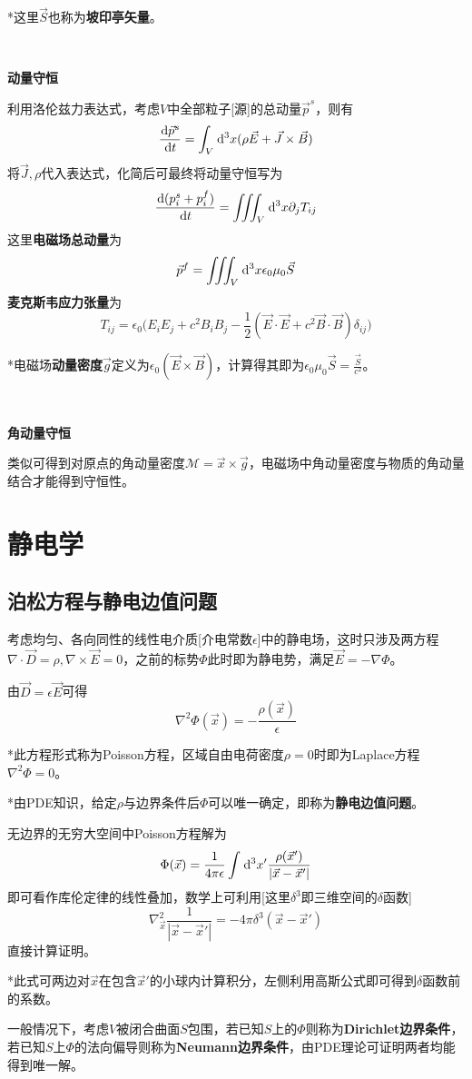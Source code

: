 \documentclass[a4paper,UTF8,fontset=windows]{ctexart}
\newcommand*{\dr}{\hspace{0.07em}\mathrm{d}}
\newcommand*{\vb}{\vec{B}}
\newcommand*{\vd}{\vec{D}}
\newcommand*{\ve}{\vec{E}}
\newcommand*{\vj}{\vec{J}}
\newcommand*{\vs}{\vec{S}}
\newcommand*{\vg}{\vec{g}}
\newcommand*{\vps}{\vec{p}}
\newcommand*{\vx}{\vec{x}}
\newcommand*{\dt}[2][t]{\frac{\dr #2}{\dr #1}}
\begin{document}
*这里$\vs$也称为\textbf{坡印亭矢量}。

\

\textbf{动量守恒}

利用洛伦兹力表达式，考虑$V$中全部粒子[源]的总动量$\vps^s$，则有
$$\dt{\vps^s}=\int_V\dr^3x(\rho\ve+\vj\times\vb)$$
将$\vj,\rho$代入表达式，化简后可最终将动量守恒写为
$$\dt{(p^s_i+p^f_i)}=\iiint_V\dr^3x\partial_jT_{ij}$$
这里\textbf{电磁场总动量}为
$$\vps^f=\iiint_V\dr^3x\epsilon_0\mu_0\vs$$
\textbf{麦克斯韦应力张量}为
$$T_{ij}=\epsilon_0\bigg(E_iE_j+c^2B_iB_j-\frac{1}{2}(\ve\cdot\ve+c^2\vb\cdot\vb)\delta_{ij}\bigg)$$

*电磁场\textbf{动量密度}$\vec{g}$定义为$\epsilon_0(\ve\times\vb)$，计算得其即为$\epsilon_0\mu_0\vs=\frac{\vs}{c^2}$。

\

\textbf{角动量守恒}

类似可得到对原点的角动量密度$\mathcal{M}=\vx\times\vg$，电磁场中角动量密度与物质的角动量结合才能得到守恒性。

\section{静电学}
\subsection{泊松方程与静电边值问题}
考虑均匀、各向同性的线性电介质[介电常数$\epsilon$]中的静电场，这时只涉及两方程$\nabla\cdot\vd=\rho,\nabla\times\ve=0$，之前的标势$\Phi$此时即为静电势，满足$\ve=-\nabla\Phi$。

由$\vd=\epsilon\ve$可得
$$\nabla^2\Phi(\vx)=-\frac{\rho(\vx)}{\epsilon}$$

*此方程形式称为Poisson方程，区域自由电荷密度$\rho=0$时即为Laplace方程$\nabla^2\Phi=0$。

*由PDE知识，给定$\rho$与边界条件后$\Phi$可以唯一确定，即称为\textbf{静电边值问题}。

无边界的无穷大空间中Poisson方程解为
$$\Phi(\vx)=\frac{1}{4\pi\epsilon}\int\dr^3x'\frac{\rho(\vx')}{|\vx-\vx'|}$$
即可看作库伦定律的线性叠加，数学上可利用[这里$\delta^3$即三维空间的$\delta$函数]
$$\nabla_{\vx}^2\frac{1}{|\vx-\vx'|}=-4\pi\delta^3(\vx-\vx')$$
直接计算证明。

*此式可两边对$\vx$在包含$\vx'$的小球内计算积分，左侧利用高斯公式即可得到$\delta$函数前的系数。

一般情况下，考虑$V$被闭合曲面$S$包围，若已知$S$上的$\Phi$则称为\textbf{Dirichlet边界条件}，若已知$S$上$\Phi$的法向偏导则称为\textbf{Neumann边界条件}，由PDE理论可证明两者均能得到唯一解。
\end{document}
